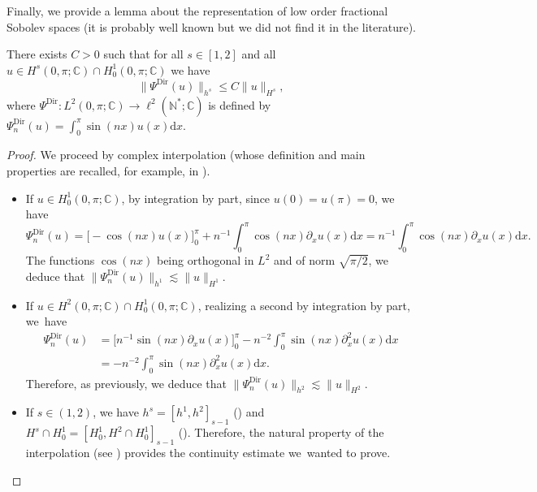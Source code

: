 Finally, we provide a lemma about the representation of low order fractional Sobolev spaces (it is probably well known but we did not find it in the literature).
\begin{lemma}
\label{lem_interpol}
There exists $C>0$ such that for all $s\in [1,2]$ and all $u\in H^s(0,\pi;\mathbb{C}) \cap H^1_0(0,\pi;\mathbb{C})$ we have
\[
\big\| \Psi^{\mathrm{Dir}}(u) \big\|_{h^s} \leq C \| u\|_{H^s},
\]
where $\Psi^{\mathrm{Dir}}: L^2(0,\pi;\mathbb{C}) \to \ell^2(\mathbb{N}^*;\mathbb{C})$ is defined by $\Psi^{\mathrm{Dir}}_n(u) = \int_0^\pi \sin(nx) u(x) \mathrm{d}x$.
\end{lemma}
\begin{proof} We proceed by complex interpolation (whose definition and main properties are recalled, for example, in \cite{Tri78,Agra15}).
\begin{itemize}
\item
If $u\in H^1_0(0,\pi;\mathbb{C})$, by integration by part, since $u(0)=u(\pi)=0$, we have
\[
\Psi^{\mathrm{Dir}}_n(u) = \big[-\cos(nx) u(x) \big]_0^\pi + n^{-1} \int_0^\pi \cos(nx) \partial_x u(x) \mathrm{d}x = n^{-1} \int_0^\pi \cos(nx) \partial_x u(x) \mathrm{d}x.
\]
The functions $\cos(nx)$ being orthogonal in $L^2$ and of norm $\sqrt{\pi/2}$, we deduce that $\| \Psi^{\mathrm{Dir}}_n(u) \|_{h^1} \lesssim \|u\|_{H^1}$.

\item
If $u\in H^2(0,\pi;\mathbb{C}) \cap H^1_0(0,\pi;\mathbb{C})$, realizing a second by integration by part, we~have
\begin{equation*}
\begin{split}
\Psi^{\mathrm{Dir}}_n(u) &= \big[n^{-1} \sin(nx) \partial_x u(x) \big]_0^\pi - n^{-2} \int_0^\pi \sin(nx) \partial_x^2 u(x) \mathrm{d}x \\
&= - n^{-2} \int_0^\pi \sin(nx) \partial_x^2 u(x) \mathrm{d}x.
\end{split}
\end{equation*}
Therefore, as previously, we deduce that $\| \Psi^{\mathrm{Dir}}_n(u) \|_{h^2} \lesssim \|u\|_{H^2}$.

\item
If $s\in (1,2)$, we have $h^s = [h^1,h^2]_{s-1}$ (\cite[Th.\ p.\,130]{Tri78}) and $H^s \cap H^1_0 = [H^1_0,H^2\cap H^1_0]_{s-1}$ (\cite[Th.\,13.2.2 p.\,198]{Agra15}). Therefore, the natural property of the interpolation (see \eg \cite[Th.\,13.2.1 p.\,197]{Agra15}) provides the continuity estimate we~wanted to prove.\qedhere
\end{itemize}
\end{proof}
